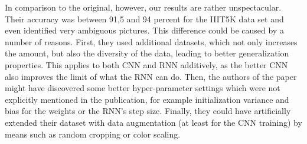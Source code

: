 \documentclass{utue} %
\begin{document}
In comparison to the original, however, our results are rather unspectacular. Their accuracy was between 91,5 and 94 percent for the IIIT5K data set and even identified very ambiguous pictures. This difference could be caused by a number of reasons. First, they used additional datasets, which not only increases the amount, but also the diversity of the data, leading to better generalization properties. This applies to both CNN and RNN additively, as the better CNN also improves the limit of what the RNN can do. Then, the authors of the paper might have discovered some better hyper-parameter settings which were not explicitly mentioned in the publication, for example initialization variance and bias for the weights or the RNN's step size. Finally, they could have artificially extended their dataset with data augmentation (at least for the CNN training) by means such as random cropping or color scaling.
\end{document}
